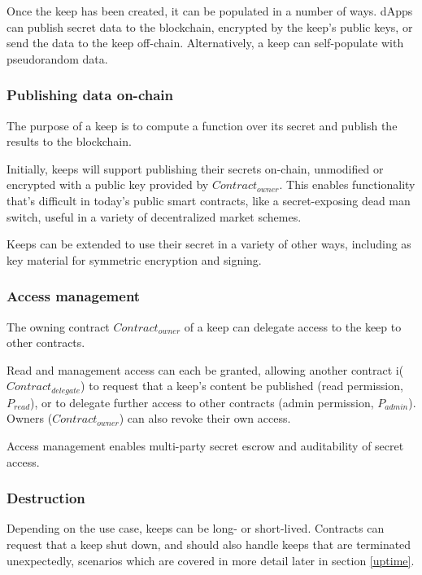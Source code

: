 \documentclass[11pt]{article}
\begin{document}
Once the keep has been created, it can be populated in a number of
ways. dApps can publish secret data to the blockchain, encrypted by
the keep's public keys, or send the data to the keep off-chain.
Alternatively, a keep can self-populate with pseudorandom data.

\subsubsection{Publishing data on-chain}

The purpose of a keep is to compute a function over its secret and
publish the results to the blockchain.

Initially, keeps will support publishing their secrets on-chain,
unmodified or encrypted with a public key provided by
$Contract_{owner}$. This enables functionality that's difficult in
today's public smart contracts, like a secret-exposing dead man
switch, useful in a variety of decentralized market schemes.

Keeps can be extended to use their secret in a variety of other ways,
including as key material for symmetric encryption and signing.

\subsubsection{Access management}

The owning contract $Contract_{owner}$ of a keep can delegate access
to the keep to other contracts.

Read and management access can each be granted, allowing another
contract i($Contract_{delegate}$) to request that a keep's content be
published (read permission, $P_{read}$), or to delegate further access
to other contracts (admin permission, $P_{admin}$). Owners
($Contract_{owner}$) can also revoke their own access.

Access management enables multi-party secret escrow and auditability
of secret access.

\subsubsection{Destruction}

Depending on the use case, keeps can be long- or short-lived.
Contracts can request that a keep shut down, and should also handle
keeps that are terminated unexpectedly, scenarios which are covered in more
detail later in section \ref{uptime}.
\end{document}
